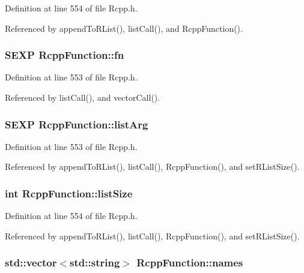 Definition at line 554 of file Rcpp.h.

Referenced by appendToRList(), listCall(), and RcppFunction().\hypertarget{classRcppFunction_a6b5966224b8b7d158be6cdfc3612063}{
\subsubsection[{fn}]{\setlength{\rightskip}{0pt plus 5cm}SEXP {\bf RcppFunction::fn}}}
\label{classRcppFunction_a6b5966224b8b7d158be6cdfc3612063}




Definition at line 553 of file Rcpp.h.

Referenced by listCall(), and vectorCall().\hypertarget{classRcppFunction_3b8a2c8441c9791f9fe5bd5273bbceec}{
\subsubsection[{listArg}]{\setlength{\rightskip}{0pt plus 5cm}SEXP {\bf RcppFunction::listArg}}}
\label{classRcppFunction_3b8a2c8441c9791f9fe5bd5273bbceec}




Definition at line 553 of file Rcpp.h.

Referenced by appendToRList(), listCall(), RcppFunction(), and setRListSize().\hypertarget{classRcppFunction_c3a42478ffd123f430ba3e09099db6f8}{
\subsubsection[{listSize}]{\setlength{\rightskip}{0pt plus 5cm}int {\bf RcppFunction::listSize}}}
\label{classRcppFunction_c3a42478ffd123f430ba3e09099db6f8}




Definition at line 554 of file Rcpp.h.

Referenced by appendToRList(), listCall(), RcppFunction(), and setRListSize().\hypertarget{classRcppFunction_bf9e86df5e1a290a5f321e6051f0d2b2}{
\subsubsection[{names}]{\setlength{\rightskip}{0pt plus 5cm}std::vector$<$std::string$>$ {\bf RcppFunction::names}}}
\label{classRcppFunction_bf9e86df5e1a290a5f321e6051f0d2b2}




